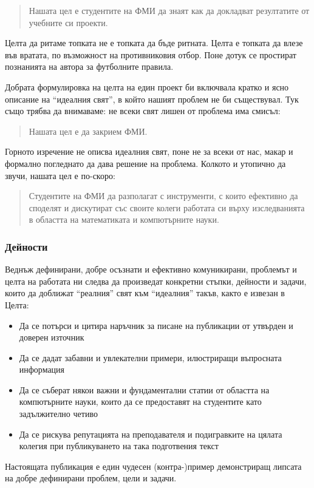 \documentclass[11pt, oneside]{article}     %
\begin{document}
\begin{quote}
  Нашата цел е студентите на ФМИ да знаят как да докладват резултатите от учебните си проекти.  
\end{quote}
Целта да ритаме топката не е топката да бъде ритната. Целта е топката да влезе във вратата, по възможност на противниковия отбор. Поне дотук се простират познанията на автора за футболните правила.

Добрата формулировка на целта на един проект би включвала кратко и ясно описание на ``идеалния свят'', в който нашият проблем не би съществувал. Тук също трябва да внимаваме: не всеки свят лишен от проблема има смисъл:
\begin{quote}
  Нашата цел е да закрием ФМИ.
\end{quote}
Горното изречение не описва идеалния свят, поне не за всеки от нас, макар и формално погледнато да дава решение на проблема. Колкото и утопично да звучи, нашата цел е по-скоро:
\begin{quote}
  Студентите на ФМИ да разполагат с инструменти, с които ефективно да споделят и дискутират със своите колеги работата си върху изследванията в областта на математиката и компютърните науки.
\end{quote}

\subsubsection*{Дейности}
Веднъж дефинирани, добре осъзнати и ефективно комуникирани, проблемът и целта на работата ни следва да произведат конкретни стъпки, дейности и задачи, които да доближат ``реалния'' свят към ``идеалния'' такъв, както е извезан в Целта:
\begin{itemize}
\item Да се потърси и цитира наръчник за писане на публикации от утвърден и доверен източник
\item Да се дадат забавни и увлекателни примери, илюстриращи въпросната информация
\item Да се съберат някои важни и фундаментални статии от областта на компютърните науки, които да се предоставят на студентите като задължително четиво
\item Да се рискува репутацията на преподавателя и подигравките на цялата колегия при публикуването на така подготвения текст
\end{itemize}

Настоящата публикация е един чудесен (контра-)пример демонстриращ липсата на добре дефинирани проблем, цели и задачи.
\end{document}
